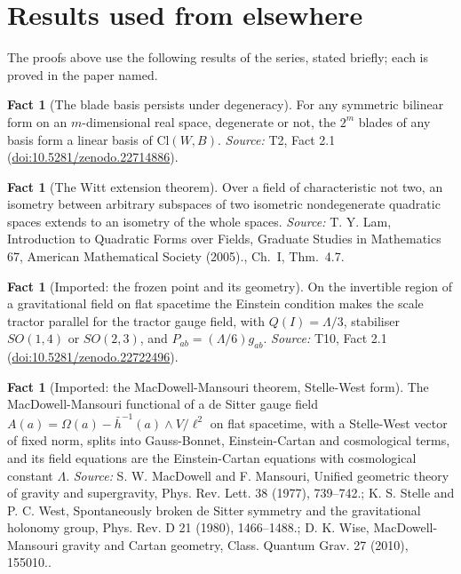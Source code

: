 \documentclass[11pt]{article}
\theoremstyle{definition}
\newtheorem{fact}[theorem]{Fact}
\theoremstyle{plain}
\providecommand{\Cl}{}\renewcommand{\Cl}{\mathrm{Cl}}
\providecommand{\hb}{}\renewcommand{\hb}{\bar{h}}
\begin{document}
\section{Results used from elsewhere}
The proofs above use the following results of the series, stated briefly; each is proved in the paper named.

\begin{fact}[The blade basis persists under degeneracy]\label{c:conformal.blade-basis-persists-under-degeneracy}
For any symmetric bilinear form on an $m$-dimensional real space, degenerate or not, the $2^m$ blades of any basis form a linear basis of $\Cl(W,B)$.
\emph{Source:} T2, Fact 2.1 (\href{https://doi.org/10.5281/zenodo.22714886}{doi:10.5281/zenodo.22714886}).
\end{fact}

\begin{fact}[The Witt extension theorem]\label{c:conformal.witt-extension-theorem}
Over a field of characteristic not two, an isometry between arbitrary subspaces of two isometric nondegenerate quadratic spaces extends to an isometry of the whole spaces.
\emph{Source:} T. Y. Lam, Introduction to Quadratic Forms over Fields, Graduate Studies in Mathematics 67, American Mathematical Society (2005)., Ch.~I, Thm.~4.7.
\end{fact}

\begin{fact}[Imported: the frozen point and its geometry]\label{c:dark-energy.imported-frozen-point-geometry}
On the invertible region of a gravitational field on flat spacetime the Einstein condition makes the scale tractor parallel for the tractor gauge field, with $Q(I) = \Lambda/3$, stabiliser $SO(1,4)$ or $SO(2,3)$, and $P_{ab} = (\Lambda/6)g_{ab}$.
\emph{Source:} T10, Fact 2.1 (\href{https://doi.org/10.5281/zenodo.22722496}{doi:10.5281/zenodo.22722496}).
\end{fact}

\begin{fact}[Imported: the MacDowell-Mansouri theorem, Stelle-West form]\label{c:dark-energy.imported-macdowell-mansouri-theorem-stelle-west}
The MacDowell-Mansouri functional of a de Sitter gauge field $A(a) = \Omega(a) - \hb^{-1}(a)\wedge V/\ell^2$ on flat spacetime, with a Stelle-West vector of fixed norm, splits into Gauss-Bonnet, Einstein-Cartan and cosmological terms, and its field equations are the Einstein-Cartan equations with cosmological constant $\Lambda$.
\emph{Source:} S. W. MacDowell and F. Mansouri, Unified geometric theory of gravity and supergravity, Phys. Rev. Lett. 38 (1977), 739--742.; K. S. Stelle and P. C. West, Spontaneously broken de Sitter symmetry and the gravitational holonomy group, Phys. Rev. D 21 (1980), 1466--1488.; D. K. Wise, MacDowell-Mansouri gravity and Cartan geometry, Class. Quantum Grav. 27 (2010), 155010..
\end{fact}
\end{document}
